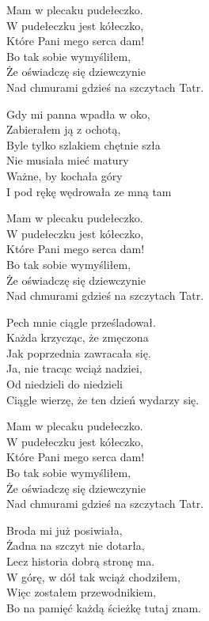 \begin{text}
    \vin Mam w plecaku pudełeczko.\\
    \vin W pudełeczku jest kółeczko,\\
    \vin Które Pani mego serca dam!\\
    \vin Bo tak sobie wymyśliłem,\\
    \vin Że oświadczę się dziewczynie\\
    \vin Nad chmurami gdzieś na szczytach Tatr.

    Gdy mi panna wpadła w oko,\\
    Zabierałem ją z ochotą,\\
    Byle tylko szlakiem chętnie szła\\
    Nie musiała mieć matury\\
    Ważne, by kochała góry\\
    I pod rękę wędrowała ze mną tam

    \vin Mam w plecaku pudełeczko.\\
    \vin W pudełeczku jest kółeczko,\\
    \vin Które Pani mego serca dam!\\
    \vin Bo tak sobie wymyśliłem,\\
    \vin Że oświadczę się dziewczynie\\
    \vin Nad chmurami gdzieś na szczytach Tatr.

    Pech mnie ciągle prześladował.\\
    Każda krzycząc, że zmęczona\\
    Jak poprzednia zawracała się.\\
    Ja, nie tracąc wciąż nadziei,\\
    Od niedzieli do niedzieli\\
    Ciągle wierzę, że ten dzień wydarzy się.

    \vin Mam w plecaku pudełeczko.\\
    \vin W pudełeczku jest kółeczko,\\
    \vin Które Pani mego serca dam!\\
    \vin Bo tak sobie wymyśliłem,\\
    \vin Że oświadczę się dziewczynie\\
    \vin Nad chmurami gdzieś na szczytach Tatr.

    Broda mi już posiwiała,\\
    Żadna na szczyt nie dotarła,\\
    Lecz historia dobrą stronę ma.\\
    W górę, w dół tak wciąż chodziłem,\\
    Więc zostałem przewodnikiem,\\
    Bo na pamięć każdą ścieżkę tutaj znam.


\end{text}
